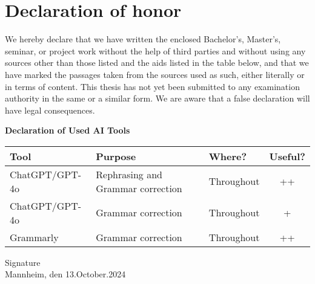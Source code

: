 \documentclass[a4paper,oneside,bibliography=totoc]{scrartcl}
\begin{document}
\backmatter

\pagebreak

\section*{Declaration of honor}\label{sec:declaration-of-honor}

We hereby declare that we have written the enclosed Bachelor's, Master's, seminar,
or project work without the help of third parties and without using any sources other than those listed and the aids listed in the table below,
and that we have marked the passages taken from the sources used as such, either literally or in terms of content.
This thesis has not yet been submitted to any examination authority in the same or a similar form.
We are aware that a false declaration will have legal consequences.

\begin{center}
    \textbf{Declaration of Used AI Tools} \\[.3em]
    \begin{tabularx}{\textwidth}{lXlc}
        \toprule
        Tool        & Purpose                       & Where?
        & Useful? \\
        \midrule
        ChatGPT/GPT-4o     & Rephrasing and Grammar correction                  & Throughout                    & ++       \\
        ChatGPT/GPT-4o     & Grammar correction               & Throughout     & +        \\
        Grammarly   & Grammar correction            & Throughout                    & ++       \\
        \bottomrule
    \end{tabularx}
\end{center}
\vspace{2cm}
\noindent Signature\\
\noindent Mannheim, den 13.October.2024 \hfill
\end{document}

